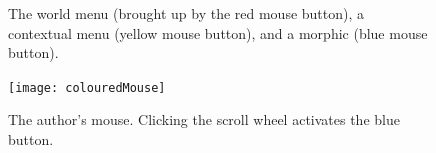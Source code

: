 \documentclass[a4paper,10pt,twoside]{book}
\begin{document}
\begin{figure}[tbh]
	\centering
	\hfill
	\hfill
	\caption{The world menu (brought up by the red mouse button), a contextual menu (yellow mouse button), and a morphic  (blue mouse button).\label{fig:threeButtons}}
\end{figure}

\begin{figure}
\texttt{[image: colouredMouse]}
\caption{The author's mouse. Clicking the scroll wheel activates the blue button.}
\label{fig:colouredMouse}
\end{figure}
\end{document}

